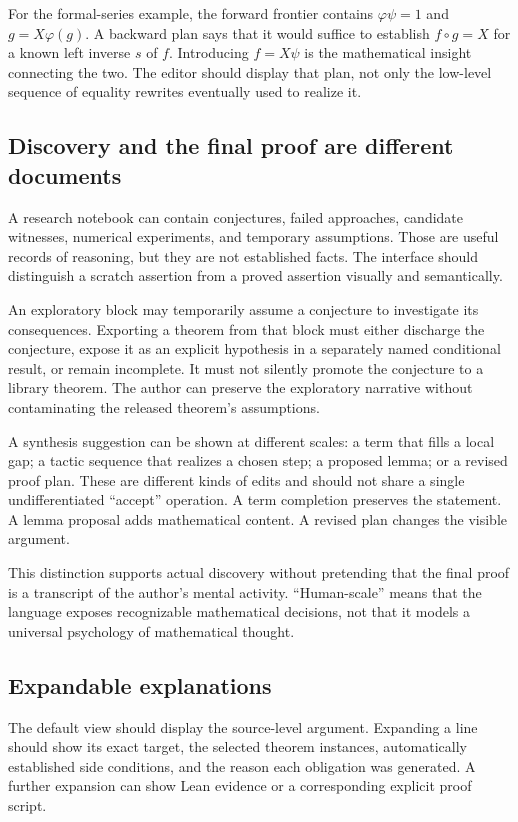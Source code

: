 \documentclass[11pt,a4paper]{article}
\begin{document}
For the formal-series example, the forward frontier contains $\varphi\psi=1$ and $g=X\varphi(g)$. A backward plan says that it would suffice to establish $f\circ g=X$ for a known left inverse $s$ of $f$. Introducing $f=X\psi$ is the mathematical insight connecting the two. The editor should display that plan, not only the low-level sequence of equality rewrites eventually used to realize it.

\subsection{Discovery and the final proof are different documents}

A research notebook can contain conjectures, failed approaches, candidate witnesses, numerical experiments, and temporary assumptions. Those are useful records of reasoning, but they are not established facts. The interface should distinguish a scratch assertion from a proved assertion visually and semantically.

An exploratory block may temporarily assume a conjecture to investigate its consequences. Exporting a theorem from that block must either discharge the conjecture, expose it as an explicit hypothesis in a separately named conditional result, or remain incomplete. It must not silently promote the conjecture to a library theorem. The author can preserve the exploratory narrative without contaminating the released theorem's assumptions.

A synthesis suggestion can be shown at different scales: a term that fills a local gap; a tactic sequence that realizes a chosen step; a proposed lemma; or a revised proof plan. These are different kinds of edits and should not share a single undifferentiated ``accept'' operation. A term completion preserves the statement. A lemma proposal adds mathematical content. A revised plan changes the visible argument.

This distinction supports actual discovery without pretending that the final proof is a transcript of the author's mental activity. ``Human-scale'' means that the language exposes recognizable mathematical decisions, not that it models a universal psychology of mathematical thought.

\subsection{Expandable explanations}

The default view should display the source-level argument. Expanding a line should show its exact target, the selected theorem instances, automatically established side conditions, and the reason each obligation was generated. A further expansion can show Lean evidence or a corresponding explicit proof script.
\end{document}
